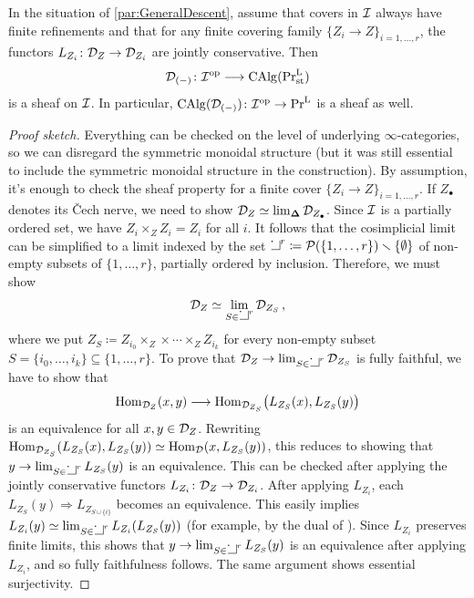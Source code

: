 \documentclass[DIV=12,numbers=enddot,leqno,bibliography=totoc]{scrartcl}
\begin{document}
	\begin{lem}\label{lem:AbstractDescent}
		In the situation of \cref{par:GeneralDescent}, assume that covers in $\mathcal{I}$ always have finite refinements and that for any finite covering family $\{Z_i\rightarrow Z\}_{i=1,\dotsc,r}$, the functors $L_{Z_i}\colon \Dd_Z\rightarrow \Dd_{Z_i}$ are jointly conservative. Then
		\begin{equation*}
			\Dd_{(-)}\colon \Ii^\op\longrightarrow \CAlg(\Pr_\mathrm{st}^\L)
		\end{equation*}
		is a sheaf on $\mathcal{I}$. In particular, $\CAlg(\Dd_{(-)})\colon \Ii^\op\rightarrow \Pr^\L$ is a sheaf as well.
	\end{lem}
	\begin{proof}[Proof sketch]
		Everything can be checked on the level of underlying $\infty$-categories, so we can disregard the symmetric monoidal structure (but it was still essential to include the symmetric monoidal structure in the construction). By assumption, it's enough to check the sheaf property for a finite cover $\{Z_i\rightarrow Z\}_{i=1,\dotsc,r}$. If $Z_\bullet$ denotes its \v Cech nerve, we need to show $\mathcal{D}_Z\simeq \operatorname*{lim}_{\boldsymbol{\Delta}}\mathcal{D}_{Z_\bullet}$. Since $\mathcal{I}$ is a partially ordered set, we have $Z_{i}\times_ZZ_i= Z_i$ for all $i$. It follows that the cosimplicial limit can be simplified to a limit indexed by the set $\pullbacksign^r\coloneqq \Pp(\{1,\dotsc,r\})\smallsetminus\{\emptyset\}$ of non-empty subsets of $\{1,\dotsc,r\}$, partially ordered by inclusion. Therefore, we must show
		\begin{equation*}
			\Dd_Z\simeq \limit_{S\in\pullbacksign^r}\Dd_{Z_S}\,,
		\end{equation*}
		where we put $Z_S\coloneqq Z_{i_0}\times_Z\times\dotsb\times_ZZ_{i_k}$ for every non-empty subset $S=\{i_0,\dotsc,i_k\}\subseteq \{1,\dotsc,r\}$. To prove that $\Dd_Z\rightarrow \limit_{S\in\pullbacksign^r}\Dd_{Z_S}$ is fully faithful, we have to show that 
		\begin{equation*}
			\operatorname{Hom}_{\mathcal{D}_Z}(x,y)\longrightarrow \operatorname{Hom}_{\mathcal{D}_{Z_S}}\bigl(L_{Z_S}(x),L_{Z_S}(y)\bigr)
		\end{equation*}
		is an equivalence for all $x,y\in \mathcal{D}_Z$. Rewriting $\operatorname{Hom}_{\mathcal{D}_{Z_S}}(L_{Z_S}(x),L_{Z_S}(y))\simeq \operatorname{Hom}_{\mathcal{D}}(x,L_{Z_S}(y))$, this reduces to showing that $y\rightarrow\limit_{S\in\pullbacksign^r}L_{Z_S}(y)$ is an equivalence. This can be checked after applying the jointly conservative functors $L_{Z_i}\colon \Dd_Z\rightarrow \Dd_{Z_i}$. After applying $L_{Z_i}$, each $L_{Z_S}(y)\Rightarrow L_{Z_{S\cup\{i\}}}$ becomes an equivalence. This easily implies $L_{Z_i}(y)\simeq \limit_{S\in\pullbacksign^r}L_{Z_i}(L_{Z_S}(y))$ (for example, by the dual of \cite[Lemma~]{HA}). Since $L_{Z_i}$ preserves finite limits, this shows that $y\rightarrow\limit_{S\in\pullbacksign^r}L_{Z_S}(y)$ is an equivalence after applying $L_{Z_i}$, and so fully faithfulness follows. The same argument shows essential surjectivity.
	\end{proof}
\end{document}
